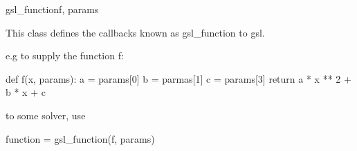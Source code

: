 \begin{funcdesc}{gsl_function}{f, params}

    This class defines the callbacks known as gsl_function to
    gsl.

    e.g to supply the function f:
    
    def f(x, params):
        a = params[0]
        b = parmas[1]
        c = params[3]
        return a * x ** 2 + b * x + c

    to some solver, use

    function = gsl_function(f, params)
    
\end{funcdesc}

